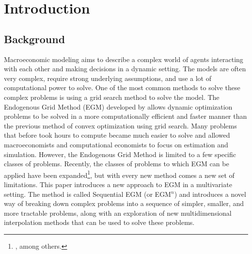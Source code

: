 \documentclass[\econtexRoot/SequentialEGM]{subfiles}
\begin{document}
\hypertarget{introduction}{}
\par\section{Introduction}
\notinsubfile{\label{sec:intro}}
\setcounter{page}{0}

\subsection{Background} %



Macroeconomic modeling aims to describe a complex world of agents interacting with each other and making decisions in a dynamic setting. The models are often very complex, require strong underlying assumptions, and use a lot of computational power to solve. One of the most common methods to solve these complex problems is using a grid search method to solve the model. The Endogenous Grid Method (EGM) developed by \cite{Carroll2006} allows dynamic optimization problems to be solved in a more computationally efficient and faster manner than the previous method of convex optimization using grid search. Many problems that before took hours to compute became much easier to solve and allowed macroeconomists and computational economists to focus on estimation and simulation.
However, the Endogenous Grid Method is limited to a few specific classes of problems. Recently, the classes of problems to which EGM can be applied have been expanded\footnote{\cite{Barillas2007, Maliar2013, Fella2014, White2015, Iskhakov2017}, among others.}, but with every new method comes a new set of limitations.
This paper introduces a new approach to EGM in a multivariate setting. The method is called Sequential EGM (or EGM$^n$) and introduces a novel way of breaking down complex problems into a sequence of simpler, smaller, and more tractable problems, along with an exploration of new multidimensional interpolation methods that can be used to solve these problems.
\end{document}

